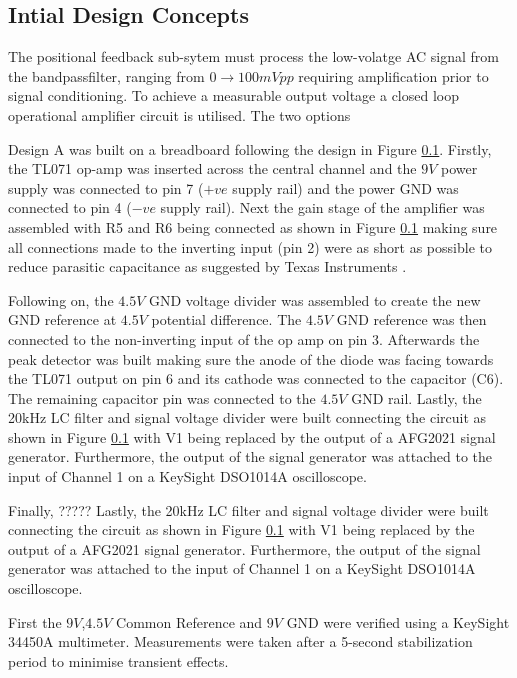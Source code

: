 \subsection{Intial Design Concepts}
The positional feedback sub-sytem must process the low-volatge AC signal from the bandpassfilter, ranging from \(0\rightarrow100mVpp\) requiring amplification prior to signal conditioning. To achieve a measurable output voltage a closed loop operational amplifier circuit is utilised. The two options 



Design A was built on a breadboard following the design in Figure \ref{}. Firstly, the TL071 op-amp was inserted across the central channel and the \(9V\) power supply was connected to pin 7 (\(+ve\) supply rail) and the power GND was connected to pin 4 (\(-ve\) supply rail). Next the gain stage of the amplifier was assembled with R5 and R6 being connected as shown in Figure \ref{} making sure all connections made to the inverting input (pin 2) were as short as possible to reduce parasitic capacitance as suggested by Texas Instruments \cite[Section 9.6]{TI_TL071}.

Following on, the \(4.5V\) GND voltage divider was assembled to create the new GND reference at \(4.5V\) potential difference. The \(4.5V\) GND reference was then connected to the non-inverting input of the op amp on pin 3. Afterwards the peak detector was built making sure the anode of the diode was facing towards the TL071 output on pin 6 and its cathode was connected to the capacitor (C6). The remaining capacitor pin was connected to the \(4.5V\) GND rail. Lastly, the 20kHz LC filter and signal voltage divider were built connecting the circuit as shown in Figure \ref{} with V1 being replaced by the output of a AFG2021 signal generator. Furthermore, the output of the signal generator was attached to the input of Channel 1 on a KeySight DSO1014A oscilloscope.

Finally, ?????
Lastly, the 20kHz LC filter and signal voltage divider were built connecting the circuit as shown in Figure \ref{} with V1 being replaced by the output of a AFG2021 signal generator. Furthermore, the output of the signal generator was attached to the input of Channel 1 on a KeySight DSO1014A oscilloscope.

First the \(9V\),\(4.5V\) Common Reference and \(9V\) GND were verified using a KeySight 34450A multimeter. Measurements were taken after a 5-second stabilization period to minimise transient effects.

